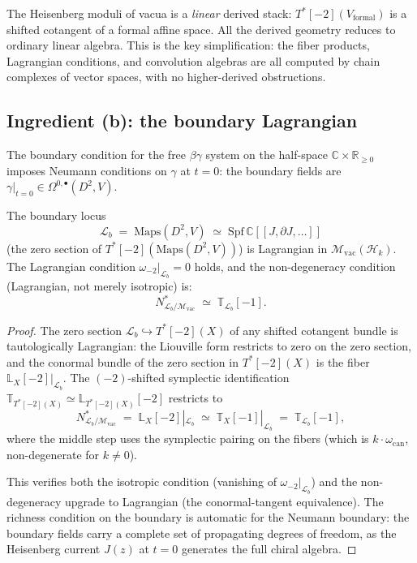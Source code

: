 \documentclass[11pt]{article}
\newcommand{\cM}{\mathcal{M}}
\newcommand{\cH}{\mathcal{H}}
\newcommand{\cL}{\mathcal{L}}
\newcommand{\C}{\mathbb{C}}
\newcommand{\R}{\mathbb{R}}
\begin{document}
\begin{remark}[Linearity]
The Heisenberg moduli of vacua is a \emph{linear} derived stack:
$T^*[-2](V_{\mathrm{formal}})$ is a shifted cotangent of a formal
affine space.  All the derived geometry reduces to ordinary
linear algebra.  This is the key simplification: the fiber products,
Lagrangian conditions, and convolution algebras are all computed
by chain complexes of vector spaces, with no higher-derived
obstructions.
\end{remark}


\subsection{Ingredient (b): the boundary Lagrangian}

The boundary condition for the free $\beta\gamma$ system on the
half-space $\C \times \R_{\ge 0}$ imposes Neumann conditions on
$\gamma$ at $t = 0$: the boundary fields are
$\gamma|_{t=0} \in \Omega^{0,\bullet}(D^2, V)$.

\begin{proposition}[Ingredient (b) for $\cH_k$]
\label{prop:steinberg-b-heisenberg}
The boundary locus
\[
\cL_b
\;=\;
\mathrm{Maps}(D^2, V)
\;\simeq\;
\mathrm{Spf}\,\C[[J, \partial J, \ldots]]
\]
(the zero section of $T^*[-2](\mathrm{Maps}(D^2,V))$)
is Lagrangian in $\cM_{\mathrm{vac}}(\cH_k)$.  The Lagrangian
condition $\omega_{-2}|_{\cL_b} = 0$ holds, and the
non-degeneracy condition (Lagrangian, not merely isotropic) is:
\begin{equation}\label{eq:lagrangian-nondeg-heisenberg}
N^*_{\cL_b / \cM_{\mathrm{vac}}}
\;\simeq\;
\mathbb{T}_{\cL_b}[-1].
\end{equation}
\end{proposition}

\begin{proof}
The zero section $\cL_b \hookrightarrow T^*[-2](X)$ of any shifted
cotangent bundle is tautologically Lagrangian: the Liouville form
restricts to zero on the zero section, and the conormal bundle of
the zero section in $T^*[-2](X)$ is the fiber
$\mathbb{L}_X[-2]|_{\cL_b}$.  The $(-2)$-shifted symplectic
identification $\mathbb{T}_{T^*[-2](X)} \simeq
\mathbb{L}_{T^*[-2](X)}[-2]$ restricts to
\[
N^*_{\cL_b / \cM_{\mathrm{vac}}}
\;=\;
\mathbb{L}_X[-2]|_{\cL_b}
\;\simeq\;
\mathbb{T}_X[-1]|_{\cL_b}
\;=\;
\mathbb{T}_{\cL_b}[-1],
\]
where the middle step uses the symplectic pairing on the fibers
(which is $k \cdot \omega_{\mathrm{can}}$, non-degenerate for
$k \ne 0$).

This verifies both the isotropic condition (vanishing of
$\omega_{-2}|_{\cL_b}$) and the non-degeneracy upgrade to
Lagrangian (the conormal-tangent equivalence).  The richness
condition on the boundary is automatic for the Neumann boundary:
the boundary fields carry a complete set of propagating degrees of
freedom, as the Heisenberg current $J(z)$ at $t = 0$ generates the
full chiral algebra.
\end{proof}
\end{document}
